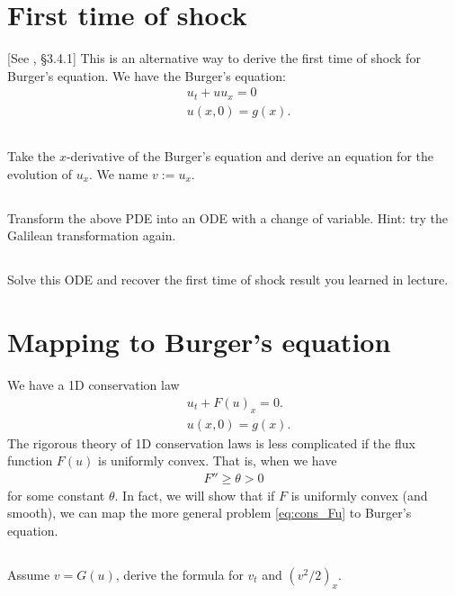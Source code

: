 \documentclass[11pt,letterpaper]{article}
\begin{document}
\section{First time of shock}
[See \cite{ShearerLevy_15}, \S 3.4.1] This is an alternative way to derive the first time of shock for Burger's equation. We have the Burger's equation:
\begin{align}
    & u_t + uu_x = 0\label{eq:burgers}\\
    & u(x,0) = g(x).\nonumber
\end{align}

\subsection{}
Take the $x$-derivative of the Burger's equation and derive an equation for the evolution of $u_x$. We name $v:= u_x$.

\subsection{}
Transform the above PDE into an ODE with a change of variable. Hint: try the Galilean transformation again.

\subsection{}
Solve this ODE and recover the first time of shock result you learned in lecture.

\section{Mapping to Burger's equation}
We have a 1D conservation law
\begin{align}
    & u_t + F(u)_x = 0.\label{eq:cons_Fu}\\
    & u(x,0) = g(x).\nonumber
\end{align}
The rigorous theory of 1D conservation laws is less complicated if the flux function $F(u)$ is uniformly convex. That is, when we have
\begin{align}
    F''\geq\theta>0
\end{align}
for some constant $\theta$. In fact, we will show that if $F$ is uniformly convex (and smooth), we can map the more general problem \eqref{eq:cons_Fu} to Burger's equation.

\subsection{}
Assume $v=G(u)$, derive the formula for $v_t$ and $(v^2/2)_x$.
\end{document}
